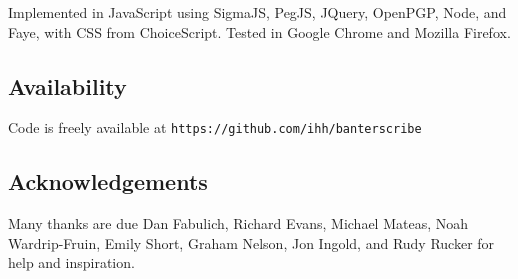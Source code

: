 \documentclass{acm_proc_article-sp}
\begin{document}
Implemented in JavaScript
using SigmaJS, PegJS, JQuery, OpenPGP, Node, and Faye,
with CSS from ChoiceScript.
Tested in Google Chrome and Mozilla Firefox.



\subsection{Availability}

Code is freely available at
{\tt https://github.com/ihh/banterscribe}


\subsection{Acknowledgements}

Many thanks are due Dan Fabulich, Richard Evans, Michael Mateas, Noah Wardrip-Fruin,
Emily Short, Graham Nelson, Jon Ingold,
and Rudy Rucker for help and inspiration.




\balancecolumns
\end{document}

